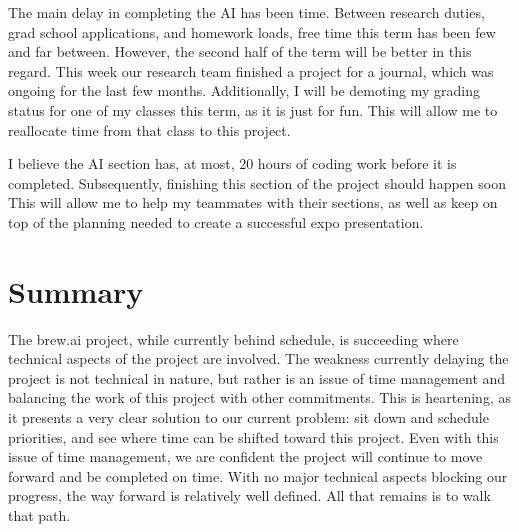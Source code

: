 \documentclass[draftclsnofoot,onecolumn,letterpaper,10pt]{IEEEtran}
\begin{document}
The main delay in completing the AI has been time.
Between research duties, grad school applications, and homework loads, free time this term has been few and far between.
However, the second half of the term will be better in this regard. This week our research team finished a project for a journal, which was ongoing for the last few months.
Additionally, I will be demoting my grading status for one of my classes this term, as it is just for fun.
This will allow me to reallocate time from that class to this project.

I believe the AI section has, at most, 20 hours of coding work before it is completed.
Subsequently, finishing this section of the project should happen soon
This will allow me to help my teammates with their sections, as well as keep on top of the planning needed to create a successful expo presentation.


\section{Summary}
The brew.ai project, while currently behind schedule, is succeeding where technical aspects of the project are involved.
The weakness currently delaying the project is not technical in nature, but rather is an issue of time management and balancing the work of this project with other commitments.
This is heartening, as it presents a very clear solution to our current problem: sit down and schedule priorities, and see where time can be shifted toward this project.
Even with this issue of time management, we are confident the project will continue to move forward and be completed on time.
With no major technical aspects blocking our progress, the way forward is relatively well defined. All that remains is to walk that path.
\end{document}
